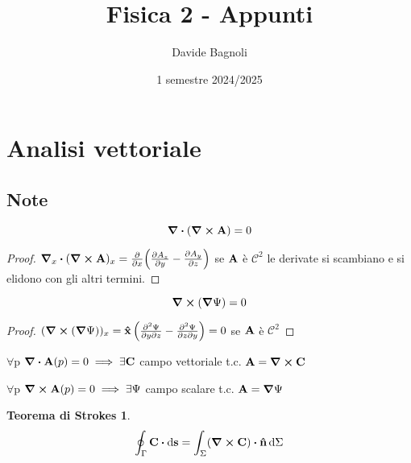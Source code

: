 \documentclass[12pt,a4paper]{article}
\title{Fisica 2 - Appunti}
\author{Davide Bagnoli}
\date{1 semestre 2024/2025}
\begin{document}
\maketitle
\tableofcontents
\newpage

\section{Analisi vettoriale}
\subsection{Note}
\begin{proposition}
    \begin{equation*}
    \div(\curl \vb{A})= 0
    \end{equation*}
\end{proposition}
\begin{proof}
$
\grad_{x}\vdot(\curl{\vb{A}})_{x}=\pdv{x}(\pdv{A_z}{y}-\pdv{A_y}{z})$
se $\vb{A}$ è $\mathcal{C}^{2}$ le derivate si scambiano e si elidono con gli altri termini.
\end{proof}

\begin{proposition}
    \begin{equation*}
    \curl(\grad \Psi)=0
    \end{equation*}
\end{proposition}

\begin{proof}
 $(\curl(\grad\Psi))_{x} = \vu{x}\left( \pdv{\Psi}{y}{z} -\pdv{\Psi}{z}{y}\right)=0$ se $\vb{A}$ è $\mathcal{C}^{2}$   
\end{proof}

\begin{theorem}
    $\forall$p $\div \vb{A}(p)= 0 \implies \exists\vb{C} $ campo vettoriale t.c. $\vb{A} = \curl \vb{C}$
\end{theorem}

\begin{theorem}
    $\forall$p $\curl \vb{A}(p)= 0 \implies \exists\Psi $ campo scalare t.c. $\vb{A} = \grad \Psi$
\end{theorem}

\newtheorem*{TS}{Teorema di Strokes}
\begin{TS}
    \begin{equation*}
    \oint_{\Gamma}\vb{C}\vdot \dd{\vb{s}}= \int_{\Sigma}(\curl \vb{C})\vdot \vu{n} \dd{\Sigma}
    \end{equation*}
\end{TS}
\end{document}
